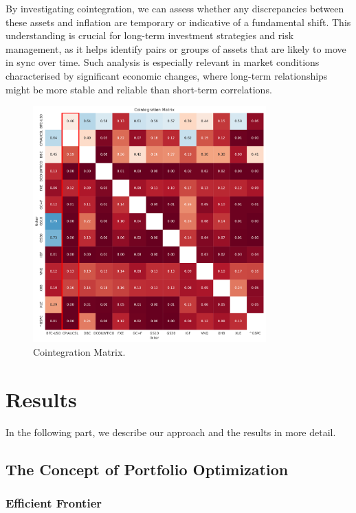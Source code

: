 \documentclass{article}
\begin{document}
By investigating cointegration, we can assess whether any discrepancies between these assets and inflation are temporary or indicative of a fundamental shift. This understanding is crucial for long-term investment strategies and risk management, as it helps identify pairs or groups of assets that are likely to move in sync over time. Such analysis is especially relevant in market conditions characterised by significant economic changes, where long-term relationships might be more stable and reliable than short-term correlations.

\begin{figure}[H]
    \centering
    \includegraphics[width=0.8\textwidth]{paper/figure/Cointegration_Matrix.pdf}
    \caption{Cointegration Matrix.}
    \label{fig:mesh3}
\end{figure}



\section{Results}

In the following part, we describe our approach and the results in more detail. 

\subsection{The Concept of Portfolio Optimization}

\subsubsection*{Efficient Frontier}
\end{document}
